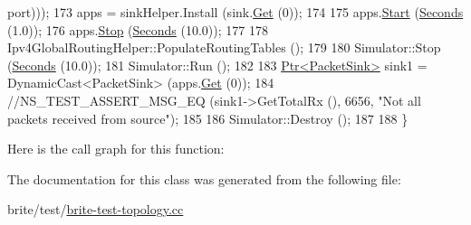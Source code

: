 \begin{DoxyCode}
      port)));
173   apps = sinkHelper.Install (sink.\hyperlink{classns3_1_1NodeContainer_a9ed96e2ecc22e0f5a3d4842eb9bf90bf}{Get} (0));
174 
175   apps.\hyperlink{classns3_1_1ApplicationContainer_a8eff87926507020bbe3e1390358a54a7}{Start} (\hyperlink{group__timecivil_ga33c34b816f8ff6628e33d5c8e9713b9e}{Seconds} (1.0));
176   apps.\hyperlink{classns3_1_1ApplicationContainer_adfc52f9aa4020c8714679b00bbb9ddb3}{Stop} (\hyperlink{group__timecivil_ga33c34b816f8ff6628e33d5c8e9713b9e}{Seconds} (10.0));
177 
178   Ipv4GlobalRoutingHelper::PopulateRoutingTables ();
179 
180   Simulator::Stop (\hyperlink{group__timecivil_ga33c34b816f8ff6628e33d5c8e9713b9e}{Seconds} (10.0));
181   Simulator::Run ();
182 
183   \hyperlink{classns3_1_1Ptr}{Ptr<PacketSink>} sink1 = DynamicCast<PacketSink> (apps.\hyperlink{classns3_1_1ApplicationContainer_a9e565807abd4213a56566a7ccd8d7509}{Get} (0));
184   \textcolor{comment}{//NS\_TEST\_ASSERT\_MSG\_EQ (sink1->GetTotalRx (), 6656, "Not all packets received from source");}
185 
186   Simulator::Destroy ();
187 
188 \}
\end{DoxyCode}


Here is the call graph for this function\+:




The documentation for this class was generated from the following file\+:\begin{DoxyCompactItemize}
\item 
brite/test/\hyperlink{brite-test-topology_8cc}{brite-\/test-\/topology.\+cc}\end{DoxyCompactItemize}
